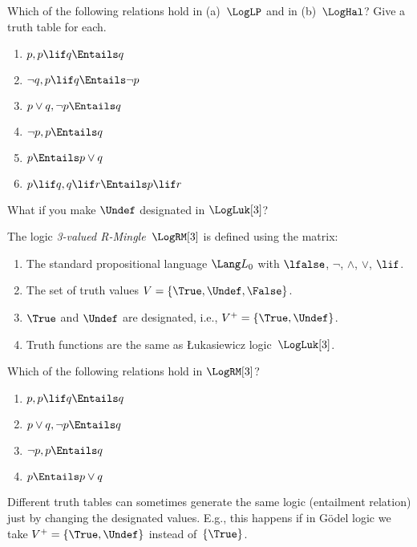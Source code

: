 \documentclass[../../../include/open-logic-section]{subfiles}
\begin{document}
\begin{prob}
  Which of the following relations hold in (a)~$\LogLP$
  and in (b)~$\LogHal$? Give a truth table for each.
  \begin{enumerate}
    \item $p, p \lif q \Entails q$
    \item $\lnot q, p \lif q \Entails \lnot p$
    \item $p \lor q, \lnot p \Entails q$
    \item $\lnot p, p \Entails q$
    \item $p \Entails p \lor q$
    \item $p \lif q, q\lif r \Entails p \lif r$
  \end{enumerate}
\end{prob}

What if you make $\Undef$ designated in $\LogLuk[3]$?

\begin{defn}
  The logic \emph{3-valued R-Mingle}~$\LogRM[3]$ is defined using the matrix:
  \begin{enumerate}
    \item The standard propositional language $\Lang L_0$ with
    $\lfalse$, $\lnot$, $\land$, $\lor$, $\lif$.
    \item The set of truth values $V = \{\True, \Undef, \False\}$.
    \item $\True$ and $\Undef$ are designated, i.e., $V^+ = \{\True, \Undef\}$.
    \item Truth functions are the same as \L ukasiewicz logic~$\LogLuk[3]$.
  \end{enumerate}
\end{defn}

\begin{prob}
  Which of the following relations hold in $\LogRM[3]$?
  \begin{enumerate}
    \item $p, p \lif q \Entails q$
    \item $p \lor q, \lnot p \Entails q$
    \item $\lnot p, p \Entails q$
    \item $p \Entails p \lor q$
  \end{enumerate}
\end{prob}

Different truth tables can sometimes generate the same logic
(entailment relation) just by changing the designated values.
E.g., this happens if in G\"odel logic we take $V^+ = \{\True,
\Undef\}$ instead of~$\{\True\}$.
\end{document}
